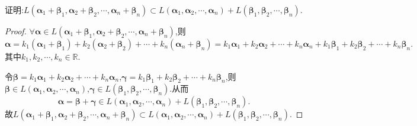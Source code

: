 \documentclass[../../main.tex]{subfiles}%
\begin{document}
\begin{proposition}\label{proposition:和空间包含于空间的和}
证明:$L\left( \boldsymbol{\alpha }_1+\boldsymbol{\beta }_1,\boldsymbol{\alpha }_2+\boldsymbol{\beta }_2,\cdots ,\boldsymbol{\alpha }_n+\boldsymbol{\beta }_n \right) \subset L\left( \boldsymbol{\alpha }_1,\boldsymbol{\alpha }_2,\cdots ,\boldsymbol{\alpha }_n \right) +L\left( \boldsymbol{\beta }_1,\boldsymbol{\beta }_2,\cdots ,\boldsymbol{\beta }_n \right)$.
\end{proposition}
\begin{proof}
$\forall \boldsymbol{\alpha }\in L(\boldsymbol{\alpha }_1+\boldsymbol{\beta }_1,\boldsymbol{\alpha }_2+\boldsymbol{\beta }_2,\cdots,\boldsymbol{\alpha }_n+\boldsymbol{\beta }_n)$,则
\[
\boldsymbol{\alpha } = k_1(\boldsymbol{\alpha }_1+\boldsymbol{\beta }_1)+k_2(\boldsymbol{\alpha }_2+\boldsymbol{\beta }_2)+\cdots +k_n(\boldsymbol{\alpha }_n+\boldsymbol{\beta }_n) = k_1\boldsymbol{\alpha }_1 + k_2\boldsymbol{\alpha }_2+\cdots +k_n\boldsymbol{\alpha }_n + k_1\boldsymbol{\beta }_1 + k_2\boldsymbol{\beta }_2+\cdots +k_n\boldsymbol{\beta }_n.
\]
其中$k_1,k_2,\cdots,k_n\in \mathbb{R}$.

令$\boldsymbol{\beta } = k_1\boldsymbol{\alpha }_1 + k_2\boldsymbol{\alpha }_2+\cdots +k_n\boldsymbol{\alpha }_n$,$\boldsymbol{\gamma } = k_1\boldsymbol{\beta }_1 + k_2\boldsymbol{\beta }_2+\cdots +k_n\boldsymbol{\beta }_n$,则$\boldsymbol{\beta }\in L(\boldsymbol{\alpha }_1,\boldsymbol{\alpha }_2,\cdots,\boldsymbol{\alpha }_n)$,$\boldsymbol{\gamma }\in L(\boldsymbol{\beta }_1,\boldsymbol{\beta }_2,\cdots,\boldsymbol{\beta }_n)$.从而
\[
\boldsymbol{\alpha }=\boldsymbol{\beta }+\boldsymbol{\gamma }\in L(\boldsymbol{\alpha }_1,\boldsymbol{\alpha }_2,\cdots,\boldsymbol{\alpha }_n)+L(\boldsymbol{\beta }_1,\boldsymbol{\beta }_2,\cdots,\boldsymbol{\beta }_n).
\]
故$L\left( \boldsymbol{\alpha }_1+\boldsymbol{\beta }_1,\boldsymbol{\alpha }_2+\boldsymbol{\beta }_2,\cdots ,\boldsymbol{\alpha }_n+\boldsymbol{\beta }_n \right) \subset L\left( \boldsymbol{\alpha }_1,\boldsymbol{\alpha }_2,\cdots ,\boldsymbol{\alpha }_n \right) +L\left( \boldsymbol{\beta }_1,\boldsymbol{\beta }_2,\cdots ,\boldsymbol{\beta }_n \right)$.
\end{proof}
\end{document}
